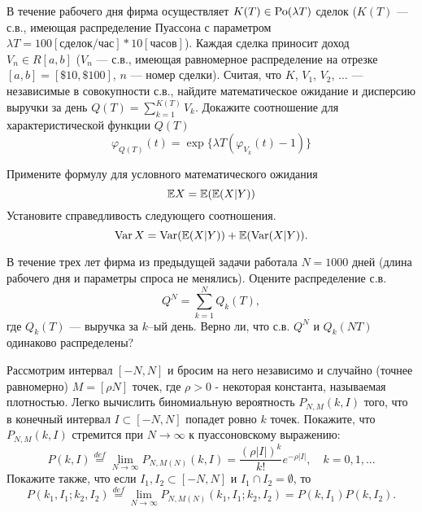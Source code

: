 \begin{problem}
В течение рабочего дня фирма осуществляет $K(T)\in \mathrm{Po}(\lambda T)$ сделок ($K(T)$ --- с.в., имеющая распределение Пуассона с параметром 
$\lambda T = 100 [\text{сделок/час}] * 10 [\text{часов}]$). Каждая сделка приносит доход $V_n\in R[a,b]$ ($V_n$ --- с.в., имеющая 
равномерное распределение на отрезке $[a,b]=[\$ 10, \$ 100]$, $n$ --- номер сделки). Считая, что $K$, $V_1$, $V_2$, $\ldots$ --- 
независимые в совокупности с.в., найдите математическое ожидание и дисперсию выручки за день $Q(T)=\sum\limits_{k=1}^{K(T)} V_k$. Докажите соотношение для характеристической функции $Q(T)$
$$
\varphi_{Q(T)}(t)=\exp\{ \lambda T(\varphi_{V_k}(t)-1)\} 
$$
   
\end{problem}

\begin{ordre}

Примените формулу для условного математического ожидания  
$$
{\mathbb E}X= \mathrm{{\mathbb E}}{( {\mathbb E}(X|Y) )} 
$$
Установите справедливость следующего соотношения.
$$
\mathop{\mathrm{Var}}\nolimits X=\mathop{\mathrm{Var}}\nolimits({\mathbb E}(X|Y))+{\mathbb E}(\mathop{\mathrm{Var}}\nolimits(X|Y)) . 
$$

\end{ordre}


\begin{problem}
В течение трех лет фирма из предыдущей задачи работала $N=1000$ дней (длина рабочего дня и параметры спроса не менялись). 
Оцените распределение с.в. 
$$Q^N=\sum\limits_{k=1}^{N} Q_k(T), 
$$
где $Q_k(T)$ --- выручка за $k$–ый день. Верно ли, что с.в. $Q^N$ и $Q_k(NT)$ одинаково распределены? 
\end{problem}




\begin{problem}
Рассмотрим интервал 
$\left[ {-N,N} \right]$ и бросим на него независимо и случайно (точнее 
равномерно) $M=\left[ {\rho N} \right]$ точек, где $\rho >0$ - некоторая 
константа, называемая плотностью. Легко вычислить биномиальную вероятность 
$P_{N,M} \left( {k,I} \right)$ того, что в конечный интервал $I\subset 
\left[ {-N,N} \right]$ попадет ровно $k$ точек. Покажите, что $P_{N,M} 
\left( {k,I} \right)$ стремится при $N\to \infty $ к пуассоновскому 
выражению:
\[
P\left( {k,I} \right)\mathop =\limits^{def} \mathop {\lim }\limits_{N\to 
\infty } P_{N,M\left( N \right)} \left( {k,I} \right)=\frac{\left( {\rho 
\left| I \right|} \right)^k}{k!}e^{-\rho \left| I \right|},
\quad
k=0,1,...
\]
Покажите также, что если $I_1 ,I_2 \subset \left[ {-N,N} \right]$ и $I_1 
\cap I_2 =\emptyset $, то
\[
P\left( {k_1 ,I_1 ;k_2 ,I_2 } \right)\mathop =\limits^{def} \mathop {\lim 
}\limits_{N\to \infty } P_{N,M\left( N \right)} \left( {k_1 ,I_1 ;k_2 ,I_2 } 
\right)=P\left( {k,I_1 } \right)P\left( {k,I_2 } \right).
\]
\end{problem}




